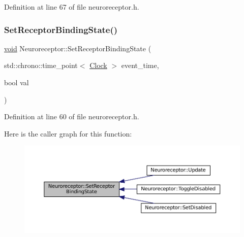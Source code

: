 Definition at line 67 of file neuroreceptor.\+h.

\mbox{\label{class_neuroreceptor_a75adddd7e615af57b8f3f841ec25463c}} 
\subsubsection{\texorpdfstring{Set\+Receptor\+Binding\+State()}{SetReceptorBindingState()}}
{\footnotesize\ttfamily \mbox{\hyperlink{glad_8h_a950fc91edb4504f62f1c577bf4727c29}{void}} Neuroreceptor\+::\+Set\+Receptor\+Binding\+State (\begin{DoxyParamCaption}\item[{std\+::chrono\+::time\+\_\+point$<$ \mbox{\hyperlink{universe_8h_a0ef8d951d1ca5ab3cfaf7ab4c7a6fd80}{Clock}} $>$}]{event\+\_\+time,  }\item[{bool}]{val }\end{DoxyParamCaption})\hspace{0.3cm}{\ttfamily [inline]}}



Definition at line 60 of file neuroreceptor.\+h.

Here is the caller graph for this function\+:\nopagebreak
\begin{figure}[H]
\begin{center}
\leavevmode
\includegraphics[width=350pt]{class_neuroreceptor_a75adddd7e615af57b8f3f841ec25463c_icgraph}
\end{center}
\end{figure}
\mbox{\label{class_neuroreceptor_a0e6e88d6c5b357872f055edbddb54d4c}} 
